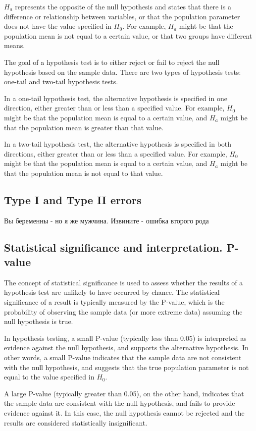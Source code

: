 \documentclass[12pt, a4paper, oneside]{article}
\begin{document}
$H_a$ represents the opposite of the null hypothesis and states that there is a difference or relationship between variables, or that the population parameter does not have the value specified in $H_0$. For example, $H_a$ might be that the population mean is not equal to a certain value, or that two groups have different means.

The goal of a hypothesis test is to either reject or fail to reject the null hypothesis based on the sample data. There are two types of hypothesis tests: one-tail and two-tail hypothesis tests.

In a one-tail hypothesis test, the alternative hypothesis is specified in one direction, either greater than or less than a specified value. For example, $H_0$ might be that the population mean is equal to a certain value, and $H_a$ might be that the population mean is greater than that value.

In a two-tail hypothesis test, the alternative hypothesis is specified in both directions, either greater than or less than a specified value. For example, $H_0$ might be that the population mean is equal to a certain value, and $H_a$ might be that the population mean is not equal to that value.
\subsection{ Type I and Type II errors }

Вы беременны - но я же мужчина. Извините - ошибка второго рода
\subsection{ Statistical significance and interpretation. P-value }
The concept of statistical significance is used to assess whether the results of a hypothesis test are unlikely to have occurred by chance. The statistical significance of a result is typically measured by the P-value, which is the probability of observing the sample data (or more extreme data) assuming the null hypothesis is true.

In hypothesis testing, a small P-value (typically less than 0.05) is interpreted as evidence against the null hypothesis, and supports the alternative hypothesis. In other words, a small P-value indicates that the sample data are not consistent with the null hypothesis, and suggests that the true population parameter is not equal to the value specified in $H_0$.

A large P-value (typically greater than 0.05), on the other hand, indicates that the sample data are consistent with the null hypothesis, and fails to provide evidence against it. In this case, the null hypothesis cannot be rejected and the results are considered statistically insignificant.
\end{document}
